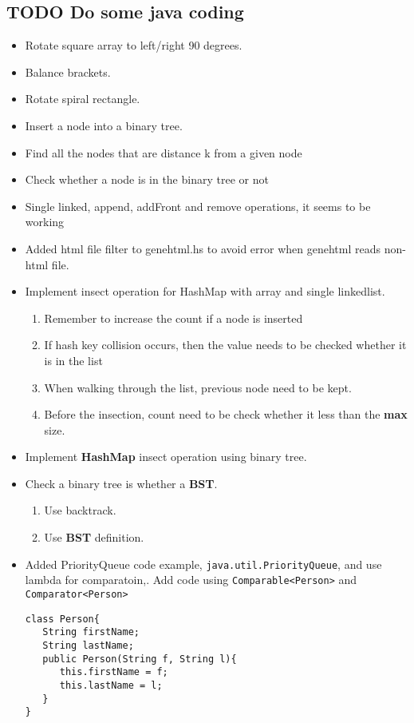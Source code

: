 \documentclass[11pt]{article}
\begin{document}
\subsection{{\bfseries\sffamily TODO} Do some java coding}
\label{sec:org3bed8b8}
\begin{itemize}
\item Rotate square array to left/right 90 degrees.
\item Balance brackets.
\item Rotate spiral rectangle.
\item Insert a node into a binary tree.
\item Find all the nodes that are distance k from a given node
\item Check whether a node is in the binary tree or not
\item Single linked, append, addFront and remove operations, it seems to be working
\item Added html file filter to genehtml.hs to avoid error when genehtml reads non-html file.
\item Implement insect operation for HashMap with array and single linkedlist.
\begin{enumerate}
\item Remember to increase the count if a node is inserted
\item If hash key collision occurs, then the value needs to be checked whether it is in the list
\item When walking through the list, previous node need to be kept.
\item Before the insection, count need to be check whether it less than the \textbf{max} size.
\end{enumerate}
\item Implement \textbf{HashMap} insect operation using binary tree.
\item Check a binary tree is whether a \textbf{BST}.
\begin{enumerate}
\item Use backtrack.
\item Use \textbf{BST} definition.
\end{enumerate}
\item Added PriorityQueue code example, \texttt{java.util.PriorityQueue}, and use lambda for comparatoin,.
Add code using \texttt{Comparable<Person>} and \texttt{Comparator<Person>}
\begin{verbatim}
class Person{
   String firstName;
   String lastName;
   public Person(String f, String l){
      this.firstName = f;
      this.lastName = l;
   }
}


\end{verbatim}
\end{itemize}
\end{document}
